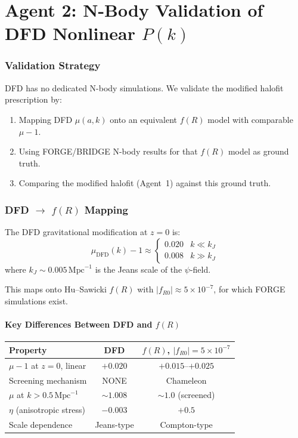 \documentclass[11pt,a4paper]{article}
\begin{document}
\part{Agent 2: N-Body Validation of DFD Nonlinear $P(k)$}
\label{part:nbody-validation}

\section{Validation Strategy}

DFD has no dedicated N-body simulations. We validate the modified halofit prescription by:
\begin{enumerate}
\item Mapping DFD $\mu(a,k)$ onto an equivalent $f(R)$ model with comparable $\mu - 1$.
\item Using FORGE/BRIDGE N-body results for that $f(R)$ model as ground truth.
\item Comparing the modified halofit (Agent~1) against this ground truth.
\end{enumerate}

\section{DFD $\to$ $f(R)$ Mapping}

The DFD gravitational modification at $z = 0$ is:
\begin{equation}
\mu_{\mathrm{DFD}}(k) - 1 \approx \begin{cases}
0.020 & k \ll k_J \\
0.008 & k \gg k_J
\end{cases}
\end{equation}
where $k_J \sim 0.005\,\mathrm{Mpc}^{-1}$ is the Jeans scale of the $\psi$-field.

This maps onto Hu--Sawicki $f(R)$ with $|f_{R0}| \approx 5 \times 10^{-7}$, for which FORGE simulations exist.

\subsection{Key Differences Between DFD and $f(R)$}

\begin{center}
\begin{tabular}{lcc}
\toprule
\textbf{Property} & \textbf{DFD} & \textbf{$f(R)$, $|f_{R0}| = 5 \times 10^{-7}$} \\
\midrule
$\mu - 1$ at $z = 0$, linear & $+0.020$ & $+0.015$--$+0.025$ \\
Screening mechanism & NONE & Chameleon \\
$\mu$ at $k > 0.5\,\mathrm{Mpc}^{-1}$ & $\sim 1.008$ & $\sim 1.0$ (screened) \\
$\eta$ (anisotropic stress) & $-0.003$ & $+0.5$ \\
Scale dependence & Jeans-type & Compton-type \\
\bottomrule
\end{tabular}
\end{center}
\end{document}
